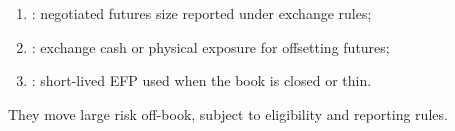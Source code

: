 \documentclass[a4paper,oneside,openany]{book}
\begin{document}
\begin{taxonomy} 
\begin{enumerate}[label=\roman*.]
\setlength{\itemsep}{0pt}
\item {}: negotiated futures size reported under exchange rules;
\item {}: exchange cash or physical exposure for offsetting futures;
\item {}: short-lived EFP used when the book is closed or thin.
\end{enumerate}
They move large risk off-book, subject to eligibility and reporting rules.
\end{taxonomy}
\end{document}
